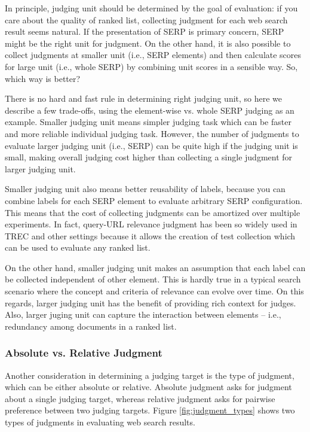 \documentclass[openany]{now} %
\begin{document}
In principle, judging unit should be determined by the goal of evaluation: if you care about the quality of ranked list, collecting judgment for each web search result seems natural. If the presentation of SERP is primary concern, SERP might be the right unit for judgment. On the other hand, it is also possible to collect judgments at smaller unit (i.e., SERP elements) and then calculate scores for large unit (i.e., whole SERP) by combining unit scores in a sensible way. So, which way is better?

There is no hard and fast rule in determining right judging unit, so here we describe a few trade-offs, using the element-wise vs. whole SERP judging as an example. Smaller judging unit means simpler judging task which can be faster and more reliable individual judging task. However, the number of judgments to evaluate larger judging unit (i.e., SERP) can be quite high if the judging unit is small, making overall judging cost higher than collecting a single judgment for larger judging unit.

Smaller judging unit also means better reusability of labels, because you can combine labels for each SERP element to evaluate arbitrary SERP configuration. This means that the cost of collecting judgments can be amortized over multiple experiments. In fact, query-URL relevance judgment has been so widely used in TREC and other settings because it allows the creation of test collection which can be used to evaluate any ranked list.

On the other hand, smaller judging unit makes an assumption that each label can be collected independent of other element. This is hardly true in a typical search scenario where the concept and criteria of relevance can evolve over time. On this regards, larger judging unit has the benefit of providing rich context for judges. Also, larger juging unit can capture the interaction between elements -- i.e., redundancy among documents in a ranked list.

\subsubsection{Absolute vs. Relative Judgment}
Another consideration in determining a judging target is the type of judgment, which can be either absolute or relative. Absolute judgment asks for judgment about a single judging target, whereas relative judgment asks for pairwise preference between two judging targets. Figure \ref{fig:judgment_types} shows two types of judgments in evaluating web search results.
\end{document}
